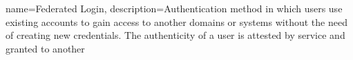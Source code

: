  {
    name={Federated Login},
    description={Authentication method in which users use existing accounts to gain access to another domains or systems
    without the need of creating new credentials. The authenticity of a user is attested by service and granted to another 
    \cite{refonline:MRFL}}
}








    
    \tableofcontents
    \newpage
    \clearpage
    \printglossary[type=acronym,title=Abbreviations,toctitle=Abbreviations]
    \clearpage
    \newpage
    \clearpage
    \printglossary[title=Glossary,toctitle=Glossary]
    \clearpage
    
    
    
    \nocite{*}
    
    
        
